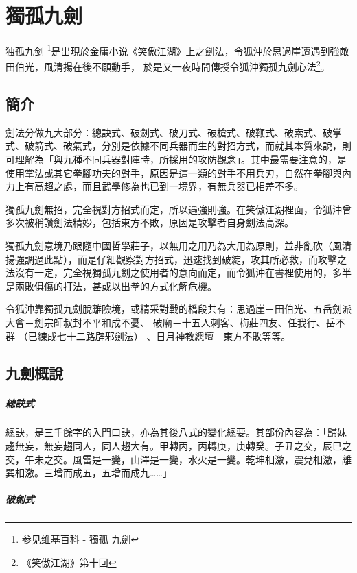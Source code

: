 \chapter{獨孤九劍}
独孤九剑
\footnote{参见维基百科 - \href{http://zh.wikipedia.org/wiki/\%E7\%8D\%A8\%E5\%AD\%A4\%E4\%B9\%9D\%E5\%8A\%8D}{獨孤
    九劍}}是出現於金庸小说《笑傲江湖》上之劍法，令狐沖於思過崖遭遇到強敵田伯光，風清揚在後不願動手，
於是又一夜時間傳授令狐沖獨孤九劍心法\footnote{《笑傲江湖》第十回}。

\section{簡介}
劍法分做九大部分：總訣式、破劍式、破刀式、破槍式、破鞭式、破索式、破掌式、破箭式、破氣式，分別是依據不同兵器而生的對招方式，而就其本質來說，則可理解為「與九種不同兵器對陣時，所採用的攻防觀念」。其中最需要注意的，是使用掌法或其它拳腳功夫的對手，原因是這一類的對手不用兵刃，自然在拳腳與內力上有高超之處，而且武學修為也已到一境界，有無兵器已相差不多。

獨孤九劍無招，完全視對方招式而定，所以遇強則強。在笑傲江湖裡面，令狐沖曾多次被稱讚劍法精妙，包括東方不敗，原因是攻擊者自身劍法高深。

獨孤九劍意境乃跟隨中國哲學莊子，以無用之用乃為大用為原則，並非亂砍（風清揚強調過此點），而是仔細觀察對方招式，迅速找到破綻，攻其所必救，而攻擊之法沒有一定，完全視獨孤九劍之使用者的意向而定，而令狐沖在書裡使用的，多半是兩敗俱傷的打法，甚或以出拳的方式化解危機。

令狐沖靠獨孤九劍脫離險境，或精采對戰的橋段共有：思過崖－田伯光、五岳劍派大會－劍宗師叔封不平和成不憂、
破廟－十五人刺客、梅莊四友、任我行、岳不群 （已練成七十二路辟邪劍法） 、日月神教總壇－東方不敗等等。

\section{九劍概說}

\paragraph{總訣式}

總訣，是三千餘字的入門口訣，亦為其後八式的變化總要。其部份內容為：「歸妹趨無妄，無妄趨同人，同人趨大有。甲轉丙，丙轉庚，庚轉癸。子丑之交，辰巳之交，午未之交。風雷是一變，山澤是一變，水火是一變。乾坤相激，震兌相激，離巽相激。三增而成五，五增而成九……」

\paragraph{破劍式}

